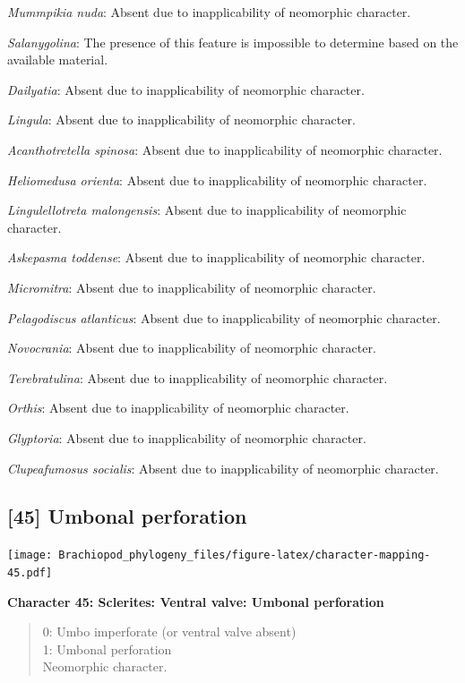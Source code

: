 \documentclass[]{book}
\theoremstyle{definition}
\theoremstyle{definition}
\theoremstyle{definition}
\theoremstyle{remark}
\begin{document}
\emph{Mummpikia nuda}: Absent due to inapplicability of neomorphic
character.

\emph{Salanygolina}: The presence of this feature is impossible to
determine based on the available material.

\emph{Dailyatia}: Absent due to inapplicability of neomorphic character.

\emph{Lingula}: Absent due to inapplicability of neomorphic character.

\emph{Acanthotretella spinosa}: Absent due to inapplicability of
neomorphic character.

\emph{Heliomedusa orienta}: Absent due to inapplicability of neomorphic
character.

\emph{Lingulellotreta malongensis}: Absent due to inapplicability of
neomorphic character.

\emph{Askepasma toddense}: Absent due to inapplicability of neomorphic
character.

\emph{Micromitra}: Absent due to inapplicability of neomorphic
character.

\emph{Pelagodiscus atlanticus}: Absent due to inapplicability of
neomorphic character.

\emph{Novocrania}: Absent due to inapplicability of neomorphic
character.

\emph{Terebratulina}: Absent due to inapplicability of neomorphic
character.

\emph{Orthis}: Absent due to inapplicability of neomorphic character.

\emph{Glyptoria}: Absent due to inapplicability of neomorphic character.

\emph{Clupeafumosus socialis}: Absent due to inapplicability of
neomorphic character.

\hypertarget{umbonal-perforation}{%
\subsection*{{[}45{]} Umbonal perforation}\label{umbonal-perforation}}

\texttt{[image: Brachiopod\_phylogeny\_files/figure-latex/character-mapping-45.pdf]}

\textbf{Character 45: Sclerites: Ventral valve: Umbonal perforation}

\begin{quote}
0: Umbo imperforate (or ventral valve absent)\\
1: Umbonal perforation\\
Neomorphic character.
\end{quote}
\end{document}
